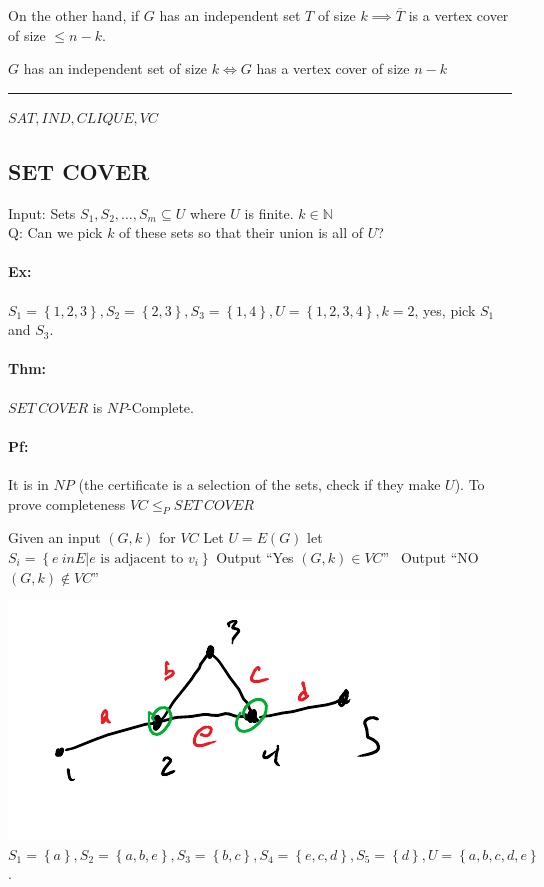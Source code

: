 \documentclass[12 pt]{article}
\begin{document}
          On the other hand, if $G$ has an independent set $T$
          of size $k\implies \overline{T}$ is a vertex cover of size
          $\leq n-k$.

          $G$ has an independent set of size $k \iff G$ has a vertex
          cover of size $n-k$
          \\ \noindent \rule{\textwidth}{0.5pt}
          $SAT, IND, CLIQUE, VC$
          \subsection{SET COVER}
          Input: Sets $S_1, S_2, \ldots, S_m \subseteq U$ where $U$ is
          finite. $k \in \mathbb{N}$
          \\ Q: Can we pick $k$ of these sets so that their union is
          all of $U$?
          \paragraph{Ex:} $S_1 = \left\{1,2,3\right\}, S_2 =
          \left\{2,3\right\}, S_3 = \left\{1,4\right\}, U=
          \left\{1,2,3,4\right\}, k = 2$, yes, pick $S_1$ and $S_3$.
          \paragraph{Thm:} $SET \ COVER$ is $NP$-Complete.
          \paragraph{Pf:} It is in $NP$ (the certificate is a
          selection of the sets, check if they make $U$). To prove
          completeness $VC \leq_P SET \ COVER$
          \begin{algorithmic}
            \State Given an input $(G,k)$ for $VC$
            \State Let $U = E(G)$
             let $S_i
            = \left\{e \ in E | e \text{ is adjacent to }v_i\right\}$
             Output ``Yes $(G,k)\in VC$''
            \Else \ Output ``NO $(G,k)\notin VC$''
            \EndIf
            \EndIf
          \end{algorithmic}
          \includegraphics[width=.9\textwidth]{i132.pdf}\\
          $S_1 = \left\{a\right\}, S_2 = \left\{a,b,e\right\}, S_3 =
          \left\{b,c\right\}, S_4 = \left\{e,c,d\right\}, S_5 =
          \left\{d\right\}, U=\left\{a,b,c,d,e\right\}$.
\end{document}
